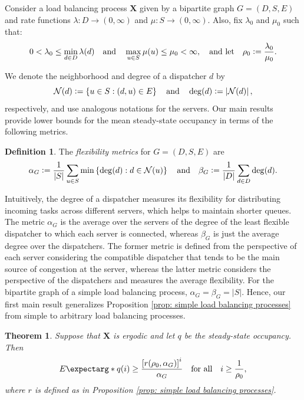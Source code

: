 \documentclass[a4paper, 12pt]{article}
\newtheorem{theorem}{Theorem}
\theoremstyle{definition}
\newtheorem{definition}{Definition}
\newcommand{\map}[3]{#1 : #2 \longrightarrow #3}
\newcommand{\set}[2]{\left\{#1 : #2\right\}}
\newcommand{\defeq}{\vcentcolon=}
\newcommand{\bX}{\boldsymbol{X}}
\newcommand{\calN}{\mathcal{N}}
\newcommand{\expect}{E\expectarg}
\begin{document}
Consider a load balancing process $\bX$ given by a bipartite graph $G = (D, S, E)$ and rate functions $\map{\lambda}{D}{(0, \infty)}$ and $\map{\mu}{S}{(0, \infty)}$. Also, fix $\lambda_0$ and $\mu_0$ such that:
\begin{equation}
	\label{eq: rate bounds}
	0 < \lambda_0 \leq \min_{d \in D} \lambda(d) \quad \text{and} \quad \max_{u \in S} \mu(u) \leq \mu_0 < \infty, \quad \text{and let} \quad \rho_0 \defeq \frac{\lambda_0}{\mu_0}.
\end{equation}

We denote the neighborhood and degree of a dispatcher $d$ by
\begin{equation*}
	\calN(d) \defeq \set{u \in S}{(d, u) \in E} \quad \text{and} \quad \deg(d) \defeq \left|\calN(d)\right|,
\end{equation*}
respectively, and use analogous notations for the servers. Our main results provide lower bounds for the mean steady-state occupancy in terms of the following metrics.

\begin{definition}
	\label{def: graph metrics}
	The \emph{flexibility metrics} for $G = (D, S, E)$ are
	\begin{equation*}
		 \alpha_G \defeq \frac{1}{|S|}\sum_{u \in S} \min \set{\deg(d)}{d \in \calN(u)} \quad \text{and} \quad \beta_G \defeq \frac{1}{|D|}\sum_{d \in D} \deg(d).
	\end{equation*}
\end{definition}

Intuitively, the degree of a dispatcher measures its flexibility for distributing incoming tasks across different servers, which helps to maintain shorter queues. The metric $\alpha_G$ is the average over the servers of the degree of the least flexible dispatcher to which each server is connected, whereas $\beta_G$ is just the average degree over the dispatchers. The former metric is defined from the perspective of each server considering the compatible dispatcher that tends to be the main source of congestion at the server, whereas the latter metric considers the perspective of the dispatchers and measures the average flexibility. For the bipartite graph of a simple load balancing process, $\alpha_G = \beta_G = |S|$. Hence, our first main result generalizes Proposition \ref{prop: simple load balancing processes} from simple to arbitrary load balancing processes.

\begin{theorem}
	\label{the: first lower bound}
	Suppose that $\bX$ is ergodic and let $q$ be the steady-state occupancy. Then
	\begin{equation*}
		\expect*{q(i)} \geq \frac{\left[r(\rho_0, \alpha_G)\right]^i}{\alpha_G} \quad \text{for all} \quad i \geq \frac{1}{\rho_0},
	\end{equation*}
	where $r$ is defined as in Proposition \ref{prop: simple load balancing processes}.
\end{theorem}
\end{document}
